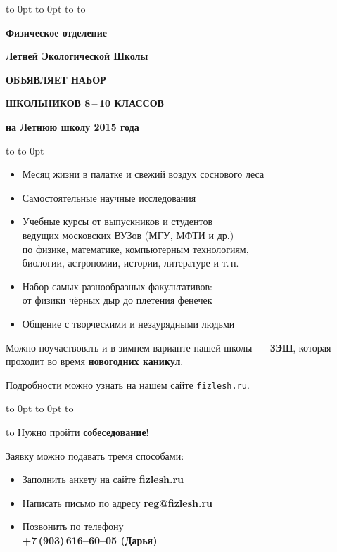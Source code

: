 \documentclass[a4paper,12pt]{article}
\begin{document}
\vbox to 0pt{%
\vbox to 0pt{\vskip9pt
\hbox to \vss}%
}%
\vskip28pt
\hbox to 
\vskip 34pt
\centerline{\Large\textbf{Физическое отделение}}
\vskip 10pt
\centerline{\Large\textbf{Летней Экологической Школы}}
\vskip15pt
\centerline{\huge\textsf{\textbf{ОБЪЯВЛЯЕТ НАБОР}}}
\vskip 15pt
\centerline{\huge\textsf{\textbf{ШКОЛЬНИКОВ 8\,--\,10 КЛАССОВ}}}
\vskip 10pt
\centerline{\Large\textbf{на
Летнюю школу {\Huge 2015} года}}
\vskip24pt
\hbox to 
\vskip-24pt\hbox to 0pt{}

{\Large%
\begin{itemize}
\setlength{\itemsep}{-4pt}
\setlength{\parindent}{0pt}
\item Месяц жизни в палатке и свежий воздух соснового леса
\item Самостоятельные научные исследования
\item Учебные курсы от выпускников и студентов\\ведущих московских ВУЗов (МГУ, МФТИ и др.)\\
по физике, математике, компьютерным технологиям,\\
биологии, астрономии, истории, литературе и т.\,п.
\item Набор самых разнообразных факультативов:\\от физики чёрных дыр до плетения фенечек
\item Общение с творческими и незаурядными людьми
\end{itemize}

Можно поучаствовать и в зимнем варианте нашей школы~--- \textbf{ЗЭШ},
которая проходит во время \textbf{новогодних каникул}.

\vskip 12pt

Подробности можно узнать на нашем сайте {\huge\texttt{fizlesh.ru}}.

\vskip-20pt

\vbox to 0pt{%
\vbox to 0pt{%
\vskip15mm
\hbox to \vss}%
}%

\hbox to 
\vskip3pt
Нужно пройти \textbf{собеседование}!\par
Заявку можно подавать тремя способами:
\begin{itemize}
\setlength{\itemsep}{-4pt}
\item Заполнить анкету на сайте \textbf{fizlesh.ru}
\item Написать письмо по адресу \textbf{reg@fizlesh.ru}
\item Позвонить по телефону\\
\textbf{+7\,(903)\,616--60--05 (Дарья)}
\end{itemize}
}%
\end{document}
